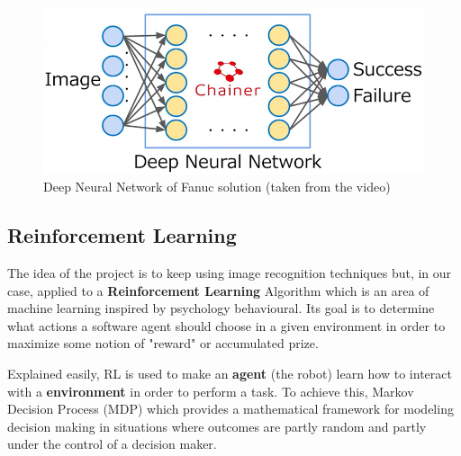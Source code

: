 	\begin{figure}
		\centering
		\includegraphics[width=0.85\linewidth]{Images/FANUC_DNN.png}
		\caption[Fanuc DNN]{Deep Neural Network of Fanuc solution (taken from the video)}
		\label{fig:fanucdnn}
	\end{figure}
	
	\subsection{Reinforcement Learning}
	
		The idea of the project is to keep using image recognition techniques but, in our case, applied to a \textbf{Reinforcement Learning} Algorithm which is an area of machine learning inspired by psychology behavioural. Its goal is to determine what actions a software agent should choose in a given environment in order to maximize some notion of "reward" or accumulated prize. 
		
		Explained easily, RL is used to make an \textbf{agent} (the robot) learn how to interact with a \textbf{environment} in order to perform a task. To achieve this, Markov Decision Process (MDP) which provides a mathematical framework for modeling decision making in situations where outcomes are partly random and partly under the control of a decision maker.
		
